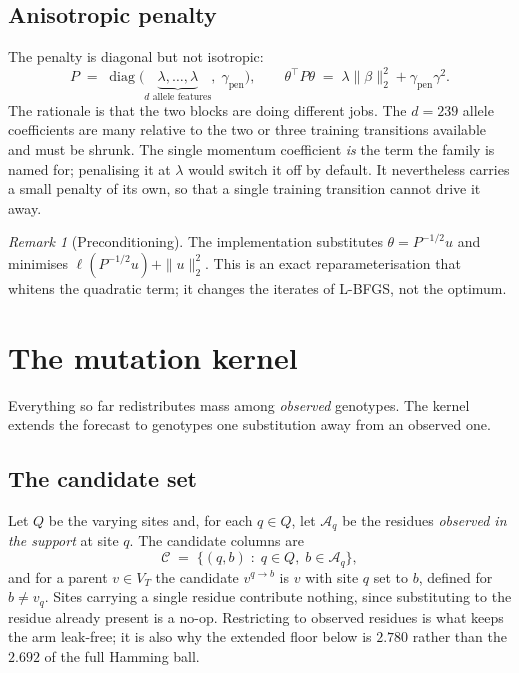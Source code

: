 \documentclass[11pt]{article}
\theoremstyle{remark}
\newtheorem{remark}{Remark}
\newcommand{\1}{\mathbf{1}}
\newcommand{\VT}{V_T}
\begin{document}
\subsection{Anisotropic penalty}\label{sec:penalty}

The penalty is diagonal but not isotropic:
\begin{equation}
  P \;=\; \operatorname{diag}\bigl(\underbrace{\lambda,\dots,\lambda}_{d
  \text{ allele features}},\; \gamma_{\mathrm{pen}}\bigr),
  \qquad
  \theta^\top P \theta \;=\; \lambda\|\beta\|_2^2 + \gamma_{\mathrm{pen}}\gamma^2 .
\end{equation}
The rationale is that the two blocks are doing different jobs. The $d = 239$ allele
coefficients are many relative to the two or three training transitions available and
must be shrunk. The single momentum coefficient \emph{is} the term the family is named
for; penalising it at $\lambda$ would switch it off by default. It nevertheless carries a
small penalty of its own, so that a single training transition cannot drive it away.

\begin{remark}[Preconditioning]
The implementation substitutes $\theta = P^{-1/2} u$ and minimises
$\ell(P^{-1/2}u) + \|u\|_2^2$. This is an exact reparameterisation that whitens the
quadratic term; it changes the iterates of L-BFGS, not the optimum.
\end{remark}

\section{The mutation kernel}\label{sec:kernel}

Everything so far redistributes mass among \emph{observed} genotypes. The kernel extends
the forecast to genotypes one substitution away from an observed one.

\subsection{The candidate set}

Let $Q$ be the varying sites and, for each $q \in Q$, let $\mathcal{A}_q$ be the residues
\emph{observed in the support} at site $q$. The candidate columns are
\begin{equation}
  \mathcal{C} \;=\; \bigl\{(q,b) \;:\; q \in Q,\; b \in \mathcal{A}_q \bigr\},
\end{equation}
and for a parent $v \in \VT$ the candidate $v^{q\to b}$ is $v$ with site $q$ set to $b$,
defined for $b \neq v_q$. Sites carrying a single residue contribute nothing, since
substituting to the residue already present is a no-op. Restricting to observed residues
is what keeps the arm leak-free; it is also why the extended floor below is $2.780$ rather
than the $2.692$ of the full Hamming ball.
\end{document}
